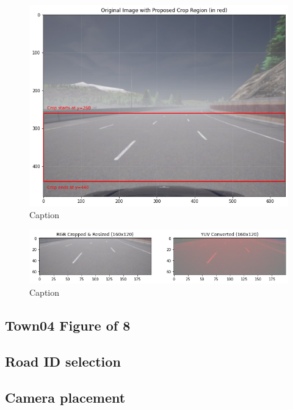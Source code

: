 \begin{figure}
    \centering
    \includegraphics[width=0.99\linewidth]{Figures/Methods/Carla-Image-Crop-Area-Town04-2c3284c.png}
    \caption{Caption}
    \label{fig:Carla-Image-Crop-Area-Town04-2c3284c.png}
\end{figure}


\begin{figure}
    \centering
    \includegraphics[width=0.99\linewidth]{Figures/Methods/Carla-Image-Crop-Resize-YUV-Town04-commit-2c3284c.png}
    \caption{Caption}
    \label{fig:Carla-Image-Crop-Resize-YUV-Town04-commit-2c3284c.png}
\end{figure}

\subsection{Town04 Figure of 8}
\subsection{Road ID selection}
\subsection{Camera placement}

